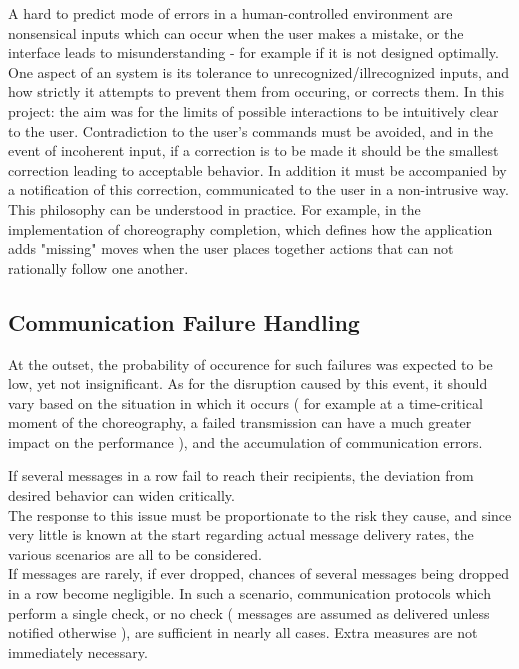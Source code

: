 A hard to predict mode of errors in a human-controlled environment are nonsensical inputs which can occur when the user makes a mistake, or the interface leads to misunderstanding - for example if it is not designed optimally.\\ 

One aspect of an system is its tolerance to unrecognized/illrecognized inputs, and how strictly it attempts to prevent them from occuring, or corrects them. In this project: the aim was for the limits of possible interactions to be intuitively clear to the user. Contradiction to the user's commands must be avoided, and in the event of incoherent input, if a correction is to be made it should be the smallest correction leading to acceptable behavior. In addition it must be accompanied by a notification of this correction, communicated to the user in a non-intrusive way.\\

This philosophy can be understood in practice. For example, in the implementation of choreography completion, which defines how the application adds "missing" moves when the user places together actions that can not rationally follow one another.



\subsection{Communication Failure Handling}

At the outset, the probability of occurence for such failures was expected to be low, yet not insignificant. As for the disruption caused by this event, it should vary based on the situation in which it occurs ( for example at a time-critical moment of the choreography, a failed transmission can have a much greater impact on the performance ), and the accumulation of communication errors.

If several messages in a row fail to reach their recipients, the deviation from desired behavior can widen critically.\\

The response to this issue must be proportionate to the risk they cause, and since very little is known at the start regarding actual message delivery rates, the various scenarios are all to be considered.\\

If messages are rarely, if ever dropped, chances of several messages being dropped in a row become negligible. In such a scenario, communication protocols which perform a single check, or no check ( messages are assumed as delivered unless notified otherwise ), are sufficient in nearly all cases. Extra measures are not immediately necessary.\\

